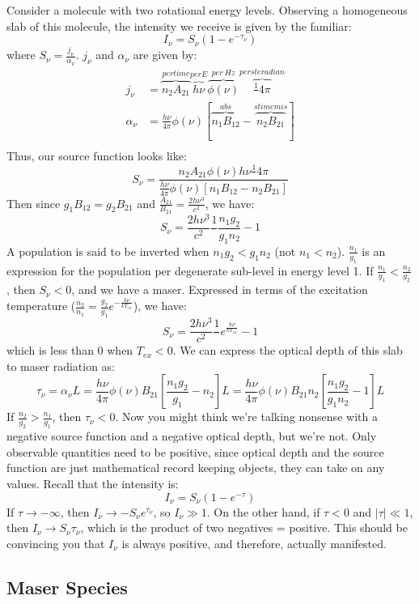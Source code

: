 \documentclass{article}
\def\ato{{A_{21}}}
\def\bto{{B_{21}}}
\def\bot{{B_{12}}}
\def\inv#1{\frac1{#1}}
\def\inv#1{{\frac{1}{}#1}}
\def\ato{{A_{21}}}
\def\bto{{B_{21}}}
\def\bot{{B_{12}}}
\def\ato{{A_{21}}}
\def\bto{{B_{21}}}
\def\bot{{B_{12}}}
\begin{document}
Consider a molecule with two rotational energy levels.  Observing a homogeneous
slab of this molecule, the intensity we receive is given by the familiar:
$$I_\nu=S_\nu(1-e^{-\tau_\nu})$$
where $S_\nu=\frac{j_\nu}{\alpha_\nu}$.  $j_\nu$ and $\alpha_\nu$ are given by:
$$\begin{aligned}j_\nu&=\overbrace{n_2\ato}^{per time}\overbrace{h\nu}^{per E}
\overbrace{\phi(\nu)}^{per\ Hz}\overbrace{\inv{4\pi}}^{per steradian}\\ 
\alpha_\nu&=\frac{h\nu}{4\pi}\phi(\nu)[\overbrace{n_1\bot}^{abs}-\overbrace{
n_2\bto}^{stim emis}]\\ \end{aligned}$$
Thus, our source function looks like:
$$S_\nu=\frac{n_2\ato\phi(\nu)h\nu\inv{4\pi}}{\frac{h\nu}{4\pi}\phi(\nu)[n_1\bot-
n_2\bto]}$$
Then since $g_1\bot=g_2\bto$ and $\frac{\ato}{\bto}=\frac{2h\nu^3}{ c^2}$, we have:
$$S_\nu=\frac{2h\nu^3}{ c^2}\inv{\frac{n_1g_2}{ g_1n_2}-1}$$
A population is said to be inverted when $n_1g_2<g_1n_2$ (not $n_1<n_2$).
$\frac{n_1}{ g_1}$ is an expression for the population per degenerate sub-level in
energy level 1.  If $\frac{n_1}{ g_1}<\frac{n_2}{ g_2}$, then $S_\nu<0$, and we
have a maser.  Expressed in terms of the excitation temperature ($\frac{n_2}{ n_1}
=\frac{g_2}{ g_1}e^{-\frac{h\nu}{ kT_{ex}}}$), we have:
$$S_\nu=\frac{2h\nu^3}{ c^2}\inv{e^\frac{h\nu}{ kT_{ex}}-1}$$
which is less than 0 when $T_{ex}<0$.  We can express the optical depth of
this slab to maser radiation as:
$$\tau_\nu=\alpha_\nu L
=\frac{h\nu}{4\pi}\phi(\nu)\bto\left[\frac{n_1g_2}{g_1}-n_2\right] L
=\frac{h\nu}{4\pi}\phi(\nu)\bto n_2\left[\frac{n_1g_2}{ g_1n_2}-1\right] L$$
If $\frac{n_2}{ g_2}>\frac{n_1}{g_1}$, then $\tau_\nu<0$.  Now you might think
we're talking nonsense with a negative source function and a negative optical
depth, but we're not. Only observable quantities need to be positive, since optical depth and the source function are just mathematical record keeping objects,
they can take on any values.
  Recall that the intensity is:
$$I_\nu=S_\nu(1-e^{-\tau})$$
If $\tau\to-\infty$, then $I_\nu\to-S_\nu e^{\tau_\nu}$, so $I_\nu\gg1$. 
On the other hand, if $\tau<0$ and $|\tau|\ll1$, then $I_\nu\to S_\nu\tau_\nu$,
which is the product of two negatives = positive.  This should be convincing
you that $I_\nu$ is always positive, and therefore, actually manifested.

\subsection{ Maser Species }
\end{document}
